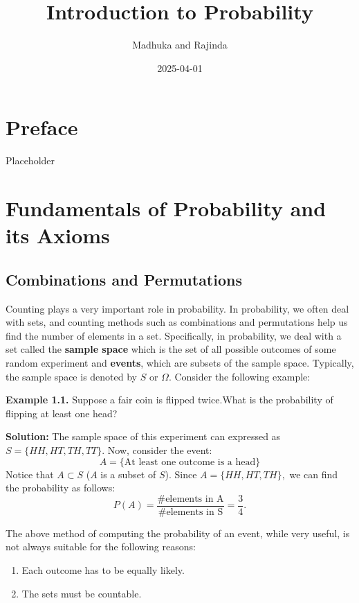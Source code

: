 \documentclass[
]{book}
\title{Introduction to Probability}
\author{Madhuka and Rajinda}
\date{2025-04-01}
\providecommand{\tightlist}{%
  \setlength{\itemsep}{0pt}\setlength{\parskip}{0pt}}
\begin{document}
\maketitle

{
\setcounter{tocdepth}{2}
\tableofcontents
}
\hypertarget{preface}{%
\chapter*{Preface}\label{preface}}


Placeholder

\hypertarget{fundamentals-of-probability-and-its-axioms}{%
\chapter{Fundamentals of Probability and its Axioms}\label{fundamentals-of-probability-and-its-axioms}}

\hypertarget{combinations-and-permutations}{%
\section{Combinations and Permutations}\label{combinations-and-permutations}}

Counting plays a very important role in probability. In probability, we often deal with sets, and counting methods such as combinations and permutations help us find the number of elements in a set. Specifically, in probability, we deal with a set called the \textbf{sample space} which is the set of all possible outcomes of some random experiment and \textbf{events}, which are subsets of the sample space. Typically, the sample space is denoted by \(S\) or \(\Omega.\) Consider the following example:

\textbf{Example 1.1.}
Suppose a fair coin is flipped twice.What is the probability of flipping at least one head?

\textbf{Solution:}
The sample space of this experiment can expressed as \(S=\{HH,HT,TH,TT\}\). Now, consider the event:
\[A=\{\text{At least one outcome is a head}\}\]
Notice that \(A\subset S\) (\(A\) is a subset of \(S\)). Since \(A=\{HH,HT,TH\},\) we can find the probability as follows:
\[P(A)= \frac{\#\text{elements in A}}{\#\text{elements in S}}=\frac{3}{4}.\]

The above method of computing the probability of an event, while very useful, is not always suitable for the following reasons:

\begin{enumerate}
\def\labelenumi{\arabic{enumi}.}
\tightlist
\item
  Each outcome has to be equally likely.
\item
  The sets must be countable.
\end{enumerate}
\end{document}
